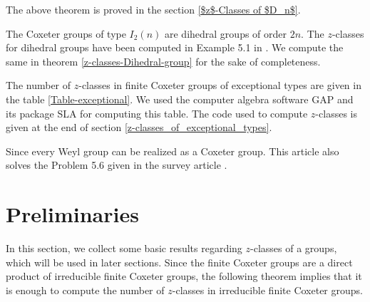 \documentclass[12pt,twoside,reqno]{amsart}
\theoremstyle{definition}
\numberwithin{equation}{section}
\begin{document}
The above theorem is proved in the section \ref{$z$-Classes of $D_n$}.

The Coxeter groups of type $I_2(n)$ are dihedral groups of order $2n.$ The $z$-classes for dihedral groups have been computed in Example 5.1 in \cite{BS}. We compute the same in theorem \ref{z-classes-Dihedral-group} for the sake of completeness.

The number of $z$-classes in finite Coxeter groups of exceptional types are given in the table \ref{Table-exceptional}. We used the computer algebra software GAP \cite{GAP4} and its package SLA \cite{SLA} for computing this table. The code used to compute $z$-classes is given at the end of section \ref{z-classes_of_exceptional_types}. 

Since every Weyl group can be realized as a Coxeter group. This article also solves the Problem 5.6 given in the survey article \cite{BS}.



\section{Preliminaries}

In this section, we collect some basic results regarding $z$-classes of a groups, which will be used in later sections. Since the finite Coxeter groups are a direct product of irreducible finite Coxeter groups, the following theorem implies that it is enough to compute the number of $z$-classes in irreducible finite Coxeter groups.
\end{document}
